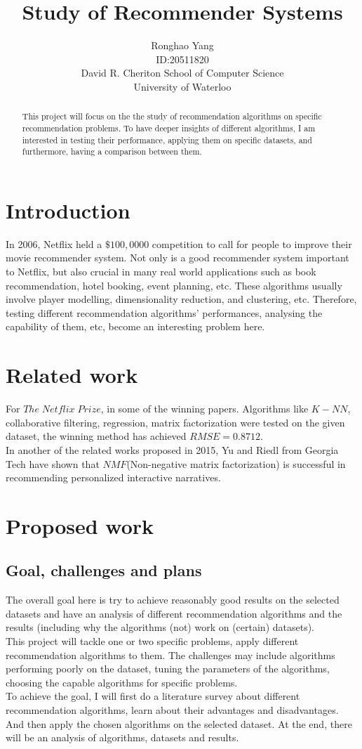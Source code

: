 \documentclass[11pt]{article} %
\title{Study of Recommender Systems}
\author{Ronghao Yang\\ID:20511820\\David R. Cheriton School of Computer Science\\University of Waterloo}
\begin{document}
\maketitle

\begin{abstract}
This project will focus on the the study of recommendation algorithms on specific recommendation problems. To have deeper insights of different algorithms, I am interested in testing their performance, applying them on specific datasets, and furthermore, having a comparison between them.
\end{abstract}
\section{Introduction}
In 2006, Netflix held a $\$100,0000$ competition\cite{netPrize} to call for people to improve their movie recommender system. Not only is a good  recommender system important to Netflix, but also crucial in many real world applications such as book recommendation, hotel booking, event planning, etc. These algorithms usually involve player modelling, dimensionality reduction, and clustering, etc. Therefore, testing different recommendation algorithms' performances, analysing the capability of them, etc, become an interesting problem here.
\section{Related work}
For $The\;Netflix\;Prize$, in some of the winning papers\cite{bigc2009}\cite{bigc2008}\cite{bellkor2007}\cite{bellkor2008}. Algorithms like $K-NN$, collaborative filtering, regression, matrix factorization were tested on the given dataset, the winning method has achieved $RMSE = 0. 8712$.\\
In another of the related works proposed in 2015, Yu and Riedl from Georgia Tech have shown that $NMF$(Non-negative matrix factorization) is successful in recommending personalized interactive narratives.
\section{Proposed work}
\subsection{Goal, challenges and plans}
The overall goal here is try to achieve reasonably good results on the selected datasets and have an analysis of different recommendation algorithms and the results (including why the algorithms (not) work on (certain) datasets). \\ 
This project will tackle one or two specific problems, apply different recommendation algorithms to them. The challenges may include algorithms performing poorly on the dataset, tuning the parameters of the algorithms, choosing the capable algorithms for specific problems.\\
To achieve the goal, I will first do a literature survey about different recommendation algorithms, learn about their advantages and disadvantages. And then apply the chosen algorithms on the selected dataset. At the end, there will be an analysis of algorithms, datasets and results.
\end{document}
